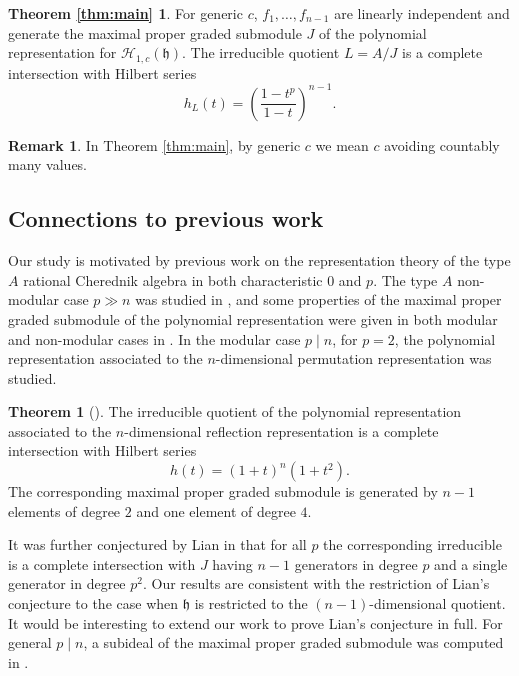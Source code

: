\documentclass{amsart}
\numberwithin{equation}{section}
\theoremstyle{definition}
\newtheorem{theorem}{Theorem}[section]
\newtheorem*{remark}{Remark}
\newcommand{\h}{\mathfrak{h}}
\newcommand{\HH}{\mathcal{H}}
\begin{document}
\newtheorem*{thm:main}{Theorem \ref{thm:main}} \begin{thm:main}
For generic $c$, $f_1, \ldots, f_{n-1}$ are linearly independent and generate the maximal proper graded submodule $J$ of the polynomial representation for $\HH_{1, c}(\h)$.  The irreducible quotient $L = A/J$ is a complete intersection with Hilbert series 
\[
h_L(t) = \left(\frac{1-t^p}{1-t}\right)^{n-1}.
\]
\end{thm:main}
\begin{remark}
In Theorem \ref{thm:main}, by generic $c$ we mean $c$ avoiding countably many values.
\end{remark}

\subsection{Connections to previous work}

Our study is motivated by previous work on the representation theory of the type $A$ rational Cherednik algebra in both characteristic $0$ and $p$.  The type $A$ non-modular case $p \gg n$ was studied in \cite{BFG}, and some properties of the maximal proper graded submodule of the polynomial representation were given in both modular and non-modular cases in \cite{BC1}.  In the modular case $p \mid n$, for $p = 2$, the polynomial representation associated to the $n$-dimensional permutation representation was studied.
\begin{theorem}[{\cite[Theorem 5.1]{L}}] \label{thm:lian}
The irreducible quotient of the polynomial representation associated to the $n$-dimensional reflection representation is a complete intersection with Hilbert series
\[
h(t) = (1 + t)^n (1 + t^2).
\]
The corresponding maximal proper graded submodule is generated by $n - 1$ elements of degree $2$ and one element of degree $4$. 
\end{theorem} 
It was further conjectured by Lian in \cite[Conjecture 5.2]{L} that for all $p$ the corresponding irreducible is a complete intersection with $J$ having $n - 1$ generators in degree $p$ and a single generator in degree $p^2$.  Our results are consistent with the restriction of Lian's conjecture to the case when $\h$ is restricted to the $(n - 1)$-dimensional quotient.  It would be interesting to extend our work to prove Lian's conjecture in full.  For general $p \mid n$, a subideal of the maximal proper graded submodule was computed in \cite[Proposition 6.1]{DS}.
\end{document}
